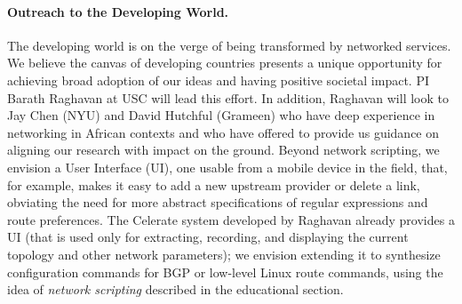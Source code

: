 \paragraph*{Outreach to the Developing World.}
%
The developing world is on the verge of being transformed by networked services.  We believe the canvas of developing countries presents a unique opportunity for achieving broad adoption of our ideas and having positive societal impact.  PI Barath Raghavan at USC will lead this effort.  In addition, Raghavan will look to Jay Chen (NYU) and David Hutchful (Grameen) who have deep experience in networking in African contexts and who have offered to provide us guidance on aligning our research with impact on the ground. Beyond network scripting, we envision a User Interface (UI), one usable from a mobile device in the field, that, for example, makes it easy to add a new upstream provider or delete a link, obviating the need for more abstract specifications of regular expressions and route preferences.  The Celerate system developed by Raghavan already provides a UI (that is used only for extracting, recording, and displaying the current topology and other network parameters); we envision extending it to synthesize configuration commands for BGP or low-level Linux route commands, using the idea of {\em network scripting} described in the educational section.

